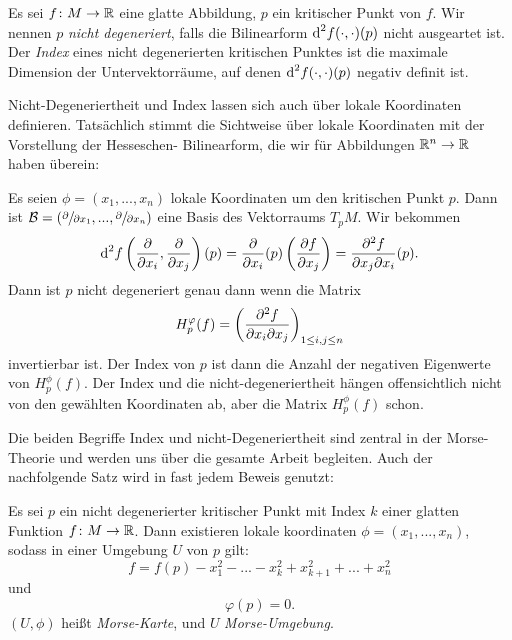 \begin{definition}
    \label{def: nicht-degeneriert u index}
    Es sei $f \colon M \to { \mathbb R }$ eine glatte Abbildung, $p$ ein kritischer Punkt von
    $f$. Wir nennen $p$ \textit{nicht degeneriert}, falls die Bilinearform 
    ${ \operatorname{d} }^2 f (\cdot, \cdot) (p)$ nicht ausgeartet ist. Der \textit{Index} eines
    nicht degenerierten kritischen Punktes ist die maximale Dimension der
    Untervektorräume, auf denen ${ \operatorname{d} }^2 f (\cdot, \cdot) (p)$ negativ definit ist.
\end{definition}

\begin{remark}
    Nicht-Degeneriertheit und Index lassen sich auch über lokale Koordinaten definieren.
    Tatsächlich stimmt die Sichtweise über lokale Koordinaten mit der Vorstellung der Hesseschen-
    Bilinearform, die wir für Abbildungen ${ \mathbb R }^n \to { \mathbb R }$ haben überein:

    Es seien $\phi = (x_1, ..., x_n)$ lokale Koordinaten um den kritischen Punkt $p$. 
    Dann ist $\mathcal{B} = \left(\pderive{x_1}, ..., \pderive{x_n}\right)$ eine Basis des
    Vektorraums $T_pM$. Wir bekommen
    \[ 
        \opd^2 f \left( \pderive{x_i}, \pderive{x_j} \right) (p) 
        = \pderive{x_i}(p) \left( \pderive[f]{x_j} \right) 
        = \pdderive[f]{x_j}{x_i} (p).
    \]
    Dann ist $p$ nicht degeneriert genau dann wenn die Matrix
    \[ H^\phi_p(f) = \left( \pdderive[f]{x_i}{x_j} \right)_{1 \leq i, j \leq n} \]
    invertierbar ist. Der Index von $p$ ist dann die Anzahl der negativen Eigenwerte
    von $H^\phi_p(f)$. Der Index und die nicht-degeneriertheit hängen offensichtlich
    nicht von den gewählten Koordinaten ab, aber die Matrix $H_p^{\phi}(f)$ schon.
\end{remark}

Die beiden Begriffe Index und nicht-Degeneriertheit sind zentral in der Morse-Theorie 
und werden uns über die gesamte Arbeit begleiten. Auch der nachfolgende Satz wird in 
fast jedem Beweis genutzt:

\begin{theorem}
    \label{satz: morse-lemma}
    Es sei $p$ ein nicht degenerierter kritischer Punkt mit Index $k$ einer glatten 
    Funktion $f \colon M \to { \mathbb R }$. Dann existieren lokale koordinaten 
    $\phi = (x_1, ..., x_n)$, sodass in einer Umgebung $U$ von $p$ gilt:
    \[ f = f(p) - x_1^2 - ... - x_k^2 + x_{k + 1}^2 + ... + x_n^2 \]
    und 
    \[ \varphi (p) = 0. \]
    $(U, \phi)$ heißt \textit{Morse-Karte}, und $U$ \textit{Morse-Umgebung}.
\end{theorem}

